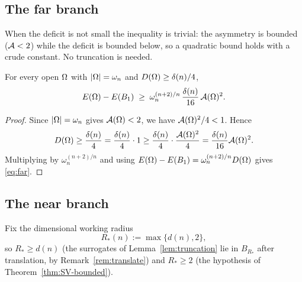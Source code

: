 \subsection{The far branch}\label{ssec:far}

When the deficit is not small the inequality is trivial: the asymmetry is
bounded ($\mathcal A<2$) while the deficit is bounded below, so a quadratic
bound holds with a crude constant. No truncation is needed.

\begin{lemma}\label{lem:far}
For every open $\Omega$ with $\left|\Omega\right|=\omega_n$ and
$D(\Omega)\ge\delta(n)/4$,
\begin{equation}\label{eq:far}
   E(\Omega)-E(B_1)\;\ge\;\omega_n^{(n+2)/n}\,\frac{\delta(n)}{16}\,\mathcal A(\Omega)^2 .
\end{equation}
\end{lemma}

\begin{proof}
Since $\left|\Omega\right|=\omega_n$ gives $\mathcal A(\Omega)<2$, we have
$\mathcal A(\Omega)^2/4<1$. Hence
\[
   D(\Omega)\ge\frac{\delta(n)}{4}
   =\frac{\delta(n)}{4}\cdot1
   \ge\frac{\delta(n)}{4}\cdot\frac{\mathcal A(\Omega)^2}{4}
   =\frac{\delta(n)}{16}\mathcal A(\Omega)^2 .
\]
Multiplying by $\omega_n^{(n+2)/n}$ and using
$E(\Omega)-E(B_1)=\omega_n^{(n+2)/n}D(\Omega)$ gives \eqref{eq:far}.
\end{proof}

\subsection{The near branch}\label{ssec:near}

Fix the dimensional working radius
\begin{equation}\label{eq:Rstar}
   R_*(n):=\max\{d(n),2\},
\end{equation}
so $R_*\ge d(n)$ (the surrogates of Lemma~\ref{lem:truncation} lie in
$B_{R_*}$ after translation, by Remark~\ref{rem:translate}) and
$R_*\ge2$ (the hypothesis of Theorem~\ref{thm:SV-bounded}).

